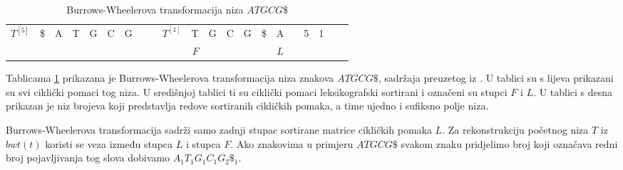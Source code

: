 \documentclass{ferseminar}
\begin{document}
\begin{table}[h]
\begin{tabular}{r c c c c c c c c c r c c c c c c c c c c}
	  \multicolumn{1}{l|}{$T^{[5]}$} & \$ & A & T & G & C & \multicolumn{1}{l|}{G} &	
	  & &    \multicolumn{1}{l|}{$T^{[1]}$} & T & G & C & G & \$ & \cellcolor[HTML]{9B9B9B} A
	  & & \multicolumn{1}{l|}{5} & 1     \\
	  
	   \cline{2-7} \cline{11-16}
	  			&	 &	 &	 &	 & 	 &					& & &			  &$F$&	  &	  &	  & & $L$	  \\
 
\end{tabular}
\caption{Burrows-Wheelerova transformacija niza $ATGCG\$$}
\label{slika:bwt}	
\end{table}

Tablicama \ref{slika:bwt} prikazana je Burrows-Wheelerova transformacija niza znakova $ATGCG\$$, sadržaja preuzetog iz \citep{salson2009four}. U tablici su s lijeva prikazani su svi ciklički pomaci tog niza. U sredi\v{s}njoj tablici ti su ciklički pomaci leksikografski sortirani i ozna\v{c}eni su stupci $F$ i $L$. U tablici s desna prikazan je niz brojeva koji predstavlja redove sortiranih cikličkih pomaka, a time ujedno i sufiksno polje niza.

Burrows-Wheelerova transformacija sadrži samo zadnji stupac sortirane matrice cikličkih pomaka $L$. Za rekonstrukciju početnog niza $T$ iz $bwt(t)$ koristi se veza između stupca $L$ i stupca $F$. Ako znakovima u primjeru $ATGCG\$$ svakom znaku pridjelimo broj koji označava redni broj pojavljivanja tog slova dobivamo $A_{1}T_{1}G_{1}C_{1}G_{2}\$_{1}$.
\end{document}
